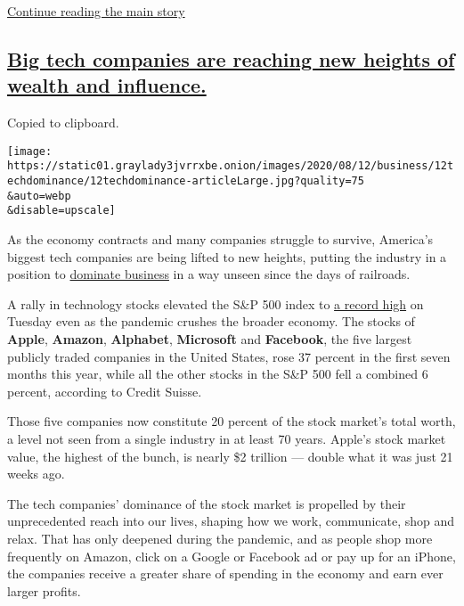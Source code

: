 \protect\hyperlink{after-dfp-ad-mid3}{Continue reading the main story}

\hypertarget{big-tech-companies-are-reaching-new-heights-of-wealth-and-influence}{%
\subsection{\texorpdfstring{\protect\hyperlink{big-tech-companies-are-reaching-new-heights-of-wealth-and-influence}{Big
tech companies are reaching new heights of wealth and
influence.}}{Big tech companies are reaching new heights of wealth and influence.}}\label{big-tech-companies-are-reaching-new-heights-of-wealth-and-influence}}

Copied to clipboard.

\texttt{[image: https://static01.graylady3jvrrxbe.onion/images/2020/08/12/business/12techdominance/12techdominance-articleLarge.jpg?quality=75\\\&auto=webp\\\&disable=upscale]}

As the economy contracts and many companies struggle to survive,
America's biggest tech companies are being lifted to new heights,
putting the industry in a position to
\href{https://www.nytimes3xbfgragh.onion/2020/08/19/technology/big-tech-business-domination.html}{dominate
business} in a way unseen since the days of railroads.

A rally in technology stocks elevated the S\&P 500 index to
\href{https://www.nytimes3xbfgragh.onion/live/2020/08/18/business/stock-market-today-coronavirus/sp-500-hits-a-record-as-traders-look-past-economic-devastation}{a
record high} on Tuesday even as the pandemic crushes the broader
economy. The stocks of \textbf{Apple}, \textbf{Amazon},
\textbf{Alphabet}, \textbf{Microsoft} and \textbf{Facebook}, the five
largest publicly traded companies in the United States, rose 37 percent
in the first seven months this year, while all the other stocks in the
S\&P 500 fell a combined 6 percent, according to Credit Suisse.

Those five companies now constitute 20 percent of the stock market's
total worth, a level not seen from a single industry in at least 70
years. Apple's stock market value, the highest of the bunch, is nearly
\$2 trillion --- double what it was just 21 weeks ago.

The tech companies' dominance of the stock market is propelled by their
unprecedented reach into our lives, shaping how we work, communicate,
shop and relax. That has only deepened during the pandemic, and as
people shop more frequently on Amazon, click on a Google or Facebook ad
or pay up for an iPhone, the companies receive a greater share of
spending in the economy and earn ever larger profits.

